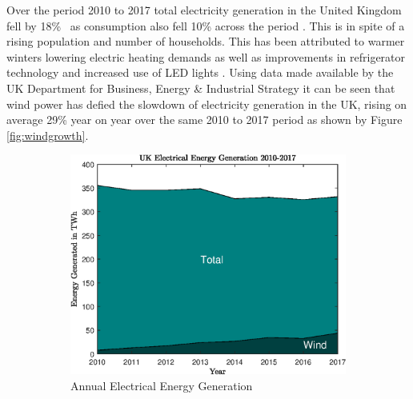 \documentclass[11pt]{article}
\begin{document}
Over the period 2010 to 2017 total electricity generation in the United Kingdom fell by \mbox{18\% \cite{data1}} as consumption also fell 10\% across the period \cite{data2}. This is in spite of a rising population and number of households. This has been attributed to warmer winters lowering electric heating demands as well as improvements in refrigerator technology and increased use of LED lights \cite{guardian}. Using data made available by the UK Department for Business, Energy \& Industrial Strategy \cite{data1} it can be seen that wind power has defied the slowdown of electricity generation in the UK, rising on average 29\% year on year over the same 2010 to 2017 period as shown by Figure \ref{fig:windgrowth}.

\begin{figure}[ht] 
        \centering
        \begin{subfigure}[b]{0.475\textwidth}
            \centering
            \includegraphics[width=\textwidth]{ukGen}
            \caption[Network2]%
            {{\small Annual Electrical Energy Generation }}    
            \label{fig:zoommesh1}
        \end{subfigure}
        \hfill
        \begin{subfigure}[b]{0.475\textwidth}  
            \centering 

\end{subfigure}
\end{figure}
\end{document}
